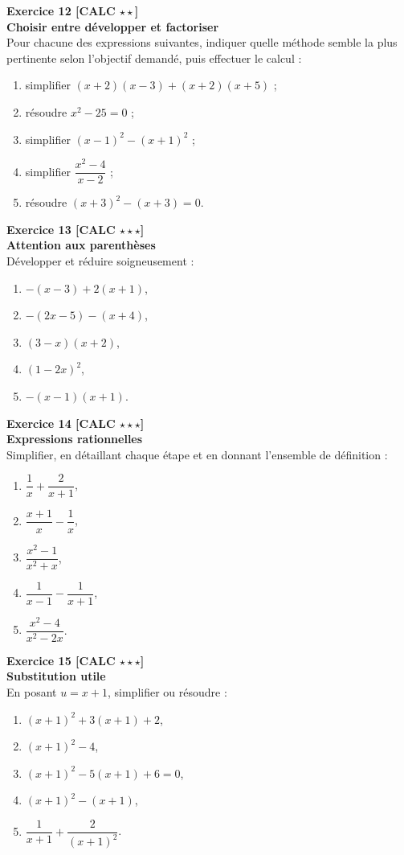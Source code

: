 \documentclass[11pt,a4paper]{article}
\begin{document}
\textbf{Exercice 12 [CALC $\star\star$]}\\
\textbf{Choisir entre développer et factoriser}\\
Pour chacune des expressions suivantes, indiquer quelle méthode semble la plus pertinente selon l’objectif demandé, puis effectuer le calcul :
\begin{enumerate}[label=\alph*)]
    \item simplifier $(x+2)(x-3)+(x+2)(x+5)$ ;
    \item résoudre $x^2-25=0$ ;
    \item simplifier $(x-1)^2-(x+1)^2$ ;
    \item simplifier $\dfrac{x^2-4}{x-2}$ ;
    \item résoudre $(x+3)^2-(x+3)=0$.
\end{enumerate}

\textbf{Exercice 13 [CALC $\star\star\star$]}\\
\textbf{Attention aux parenthèses}\\
Développer et réduire soigneusement :
\begin{enumerate}[label=\alph*)]
    \item $-(x-3)+2(x+1)$,
    \item $-(2x-5)-(x+4)$,
    \item $(3-x)(x+2)$,
    \item $(1-2x)^2$,
    \item $-(x-1)(x+1)$.
\end{enumerate}

\textbf{Exercice 14 [CALC $\star\star\star$]}\\
\textbf{Expressions rationnelles}\\
Simplifier, en détaillant chaque étape et en donnant l’ensemble de définition :
\begin{enumerate}[label=\alph*)]
    \item $\dfrac{1}{x}+\dfrac{2}{x+1}$,
    \item $\dfrac{x+1}{x}-\dfrac{1}{x}$,
    \item $\dfrac{x^2-1}{x^2+x}$,
    \item $\dfrac{1}{x-1}-\dfrac{1}{x+1}$,
    \item $\dfrac{x^2-4}{x^2-2x}$.
\end{enumerate}

\textbf{Exercice 15 [CALC $\star\star\star$]}\\
\textbf{Substitution utile}\\
En posant $u=x+1$, simplifier ou résoudre :
\begin{enumerate}[label=\alph*)]
    \item $(x+1)^2+3(x+1)+2$,
    \item $(x+1)^2-4$,
    \item $(x+1)^2-5(x+1)+6=0$,
    \item $(x+1)^2-(x+1)$,
    \item $\dfrac{1}{x+1}+\dfrac{2}{(x+1)^2}$.
\end{enumerate}
\end{document}
